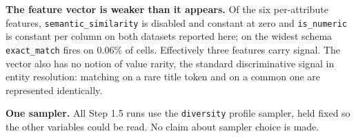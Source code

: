 \documentclass[11pt]{article}
\begin{document}
\textbf{The feature vector is weaker than it appears.} Of the six per-attribute features,
\texttt{semantic\_similarity} is disabled and constant at zero and \texttt{is\_numeric} is
constant per column on both datasets reported here; on the widest schema
\texttt{exact\_match} fires on 0.06\% of cells. Effectively three features carry signal. The
vector also has no notion of value rarity, the standard discriminative signal in entity
resolution: matching on a rare title token and on a common one are represented identically.

\textbf{One sampler.} All Step 1.5 runs use the \texttt{diversity} profile sampler, held
fixed so the other variables could be read. No claim about sampler choice is made.
\end{document}
